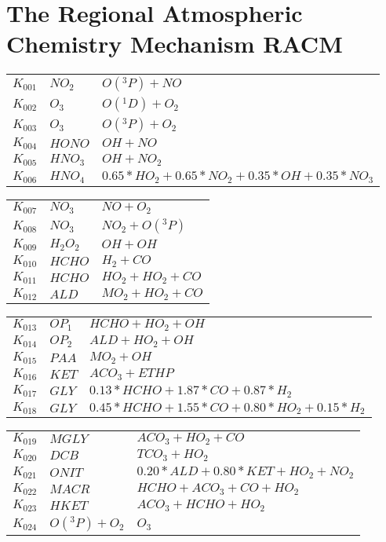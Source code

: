 \chapter*{The Regional Atmospheric Chemistry Mechanism RACM}
\label{RACM}
%
%
{\small
\newlength{\chfwidth}
\setlength{\chfwidth}{1\textwidth}
\noindent
\begin{tabular}{l@{\,:\,}p{0.2\chfwidth}@{$\quad\longrightarrow\quad$}p{0.6\chfwidth}}
$K_{001}$ & $NO_{2}$ & $O({}^3P)+NO$ \\
$K_{002}$ & $O_{3}$ & $O({}^1D)+O_{2}$ \\
$K_{003}$ & $O_{3}$ & $O({}^3P)+O_{2}$ \\
$K_{004}$ & $HONO$ & $OH+NO$ \\
$K_{005}$ & $HNO_{3}$ & $OH+NO_{2}$ \\
$K_{006}$ & $HNO_{4}$ & $0.65*HO_{2}+0.65*NO_{2}+0.35*OH+0.35*NO_{3}$ \\
\end{tabular}

\begin{tabular}{l@{\,:\,}p{0.2\chfwidth}@{$\quad\longrightarrow\quad$}p{0.6\chfwidth}}
$K_{007}$ & $NO_{3}$ & $NO+O_{2}$ \\
$K_{008}$ & $NO_{3}$ & $NO_{2}+O({}^3P)$ \\
$K_{009}$ & $H_{2}O_{2}$ & $OH+OH$ \\
$K_{010}$ & $HCHO$ & $H_{2}+CO$ \\
$K_{011}$ & $HCHO$ & $HO_{2}+HO_{2}+CO$ \\
$K_{012}$ & $ALD$ & $MO_{2}+HO_{2}+CO$ \\
\end{tabular}

\begin{tabular}{l@{\,:\,}p{0.2\chfwidth}@{$\quad\longrightarrow\quad$}p{0.6\chfwidth}}
$K_{013}$ & $OP_{1}$ & $HCHO+HO_{2}+OH$ \\
$K_{014}$ & $OP_{2}$ & $ALD+HO_{2}+OH$ \\
$K_{015}$ & $PAA$ & $MO_{2}+OH$ \\
$K_{016}$ & $KET$ & $ACO_{3}+ETHP$ \\
$K_{017}$ & $GLY$ & $0.13*HCHO+1.87*CO+0.87*H_{2}$ \\
$K_{018}$ & $GLY$ & $0.45*HCHO+1.55*CO+0.80*HO_{2}+0.15*H_{2}$ \\
\end{tabular}

\begin{tabular}{l@{\,:\,}p{0.2\chfwidth}@{$\quad\longrightarrow\quad$}p{0.6\chfwidth}}
$K_{019}$ & $MGLY$ & $ACO_{3}+HO_{2}+CO$ \\
$K_{020}$ & $DCB$ & $TCO_{3}+HO_{2}$ \\
$K_{021}$ & $ONIT$ & $0.20*ALD+0.80*KET+HO_{2}+NO_{2}$ \\
$K_{022}$ & $MACR$ & $HCHO+ACO_{3}+CO+HO_{2}$ \\
$K_{023}$ & $HKET$ & $ACO_{3}+HCHO+HO_{2}$ \\
$K_{024}$ & $O({}^3P)+O_{2}$ & $O_{3}$ \\
\end{tabular}

}
